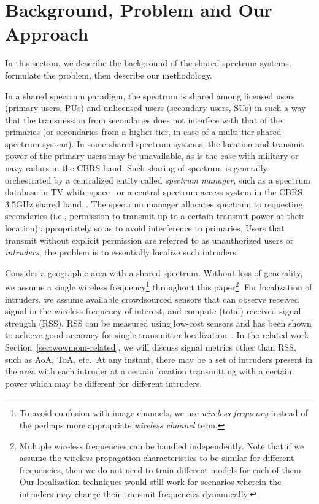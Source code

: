 \section{Background, \mtl Problem and Our Approach}
\label{sec:problem}
\label{sec:prob-def}

In this section, we describe the background of the shared spectrum systems,
formulate the \mtl problem, then describe our methodology. 

 In a shared spectrum paradigm, the
spectrum is shared among licensed users (primary users, PUs) and
unlicensed users (secondary users, SUs) in such a way that the
transmission from secondaries does not interfere with that of the
primaries (or secondaries from a higher-tier, in case of a multi-tier
shared spectrum system). In some shared spectrum systems,
the location and transmit power of the primary users may be
unavailable, as is the case with military or navy radars in the CBRS band.
Such sharing of spectrum is generally orchestrated by a centralized
entity called {\em spectrum manager}, such as a spectrum
database in TV white
space~\cite{sas-paper} or a central spectrum access system in
the CBRS 3.5GHz shared band~\cite{milind2015dyspan}. The spectrum
manager allocates spectrum to requesting secondaries (i.e., permission
to transmit up to a certain transmit power at their location) appropriately
so as to avoid interference to primaries.
Users that transmit without explicit permission are referred to as 
unauthorized users or {\em intruders}; the \mtl problem is to essentially
localize such intruders. 

  Consider a geographic
area with a shared spectrum. Without loss of generality, we assume a
single wireless frequency\footnote{To avoid confusion with image channels, we use {\em wireless frequency} instead of the perhaps more appropriate {\em wireless channel} term.} throughout this paper\footnote{Multiple wireless frequencies can be handled independently. 
Note that if we assume the wireless propagation characteristics to be similar for different frequencies, then we do not need to train different models for each of them. Our localization techniques would still work
for scenarios wherein the intruders may change their transmit frequencies dynamically.}.
For localization of intruders, we assume
available crowdsourced sensors that can observe received signal in the wireless frequency of interest, and compute (total) received signal strength (RSS).
RSS can be measured using low-cost sensors and has been shown to achieve good accuracy for single-transmitter localization~\cite{infocom00-radar}.
In the related work Section~\ref{sec:wowmom-related}, we will discuss signal metrics other than RSS, such as AoA, ToA, etc.~At any instant, there may be a set of intruders
present in the area with each intruder at a certain location transmitting
with a certain power which may be different for different intruders.


